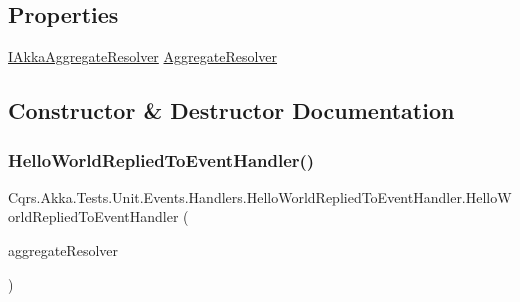 \subsection*{Properties}
\begin{DoxyCompactItemize}
\item 
\hyperlink{interfaceCqrs_1_1Akka_1_1Domain_1_1IAkkaAggregateResolver}{I\+Akka\+Aggregate\+Resolver} \hyperlink{classCqrs_1_1Akka_1_1Tests_1_1Unit_1_1Events_1_1Handlers_1_1HelloWorldRepliedToEventHandler_aead9e7b0edae372414fffea474407514}{Aggregate\+Resolver}
\end{DoxyCompactItemize}


\subsection{Constructor \& Destructor Documentation}
\mbox{\label{classCqrs_1_1Akka_1_1Tests_1_1Unit_1_1Events_1_1Handlers_1_1HelloWorldRepliedToEventHandler_aa566f26a38bc21ed270a1854de47408d}} 
\subsubsection{\texorpdfstring{Hello\+World\+Replied\+To\+Event\+Handler()}{HelloWorldRepliedToEventHandler()}}
{\footnotesize\ttfamily Cqrs.\+Akka.\+Tests.\+Unit.\+Events.\+Handlers.\+Hello\+World\+Replied\+To\+Event\+Handler.\+Hello\+World\+Replied\+To\+Event\+Handler (\begin{DoxyParamCaption}\item[{\hyperlink{interfaceCqrs_1_1Akka_1_1Domain_1_1IAkkaAggregateResolver}{I\+Akka\+Aggregate\+Resolver}}]{aggregate\+Resolver }\end{DoxyParamCaption})}



